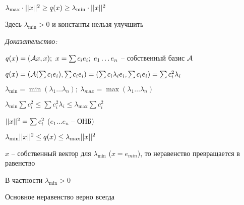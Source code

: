 \documentclass[12pt]{article}
\begin{document}
\begin{theo}{}
    $\lambda_{\max} \cdot || x ||^2 \geq q(x) \geq \lambda_{\min} \cdot || x ||^2$

    Здесь $\lambda_{\min} > 0$ и константы нельзя улучшить
\end{theo}

\textit{Доказательство:}

$q(x) = (\mathcal{A} x, x);\ x = \sum c_ie_i;\ e_1 \ldots e_n$ -- собственный базис $\mathcal{A}$

$q(x) = (\mathcal{A}(\sum c_ie_i), \sum c_ie_i) = (\sum c_i\lambda_i e_i, \sum c_ie_i) = \sum c_i^2\lambda_i$

$\lambda_{\min} = \min(\lambda_1 \ldots \lambda_n);\ \lambda_{max} = \max(\lambda_1 \ldots \lambda_n)$

$\lambda_{\min} \sum c_i^2 \leq \sum c_i^2 \lambda_i \leq \lambda_{\max} \sum c_i^2$

$|| x ||^2 = \sum c_i^2$ ($e_1 \ldots e_n$ -- ОНБ)

$\lambda_{\min} || x ||^2 \leq q(x) \leq \lambda_{\max} || x ||^2$

\begin{Remark}{}
    $x$ -- собственный вектор для $\lambda_{\min}$ ($x = e_{min}$), то неравенство превращается в равенство 

    В частности $\lambda_{\min} > 0$
\end{Remark}

\begin{Remark}{}
    Основное неравенство верно всегда 
\end{Remark}
\end{document}
